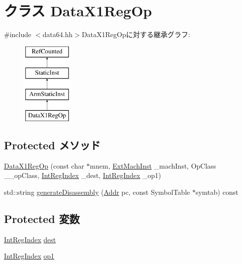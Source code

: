 \hypertarget{classArmISA_1_1DataX1RegOp}{
\section{クラス DataX1RegOp}
\label{classArmISA_1_1DataX1RegOp}
}


{\ttfamily \#include $<$data64.hh$>$}DataX1RegOpに対する継承グラフ:\begin{figure}[H]
\begin{center}
\leavevmode
\includegraphics[height=4cm]{classArmISA_1_1DataX1RegOp}
\end{center}
\end{figure}
\subsection*{Protected メソッド}
\begin{DoxyCompactItemize}
\item 
\hyperlink{classArmISA_1_1DataX1RegOp_a32e724330de9abbc94cd6f191b2a7cdb}{DataX1RegOp} (const char $\ast$mnem, \hyperlink{classStaticInst_a5605d4fc727eae9e595325c90c0ec108}{ExtMachInst} \_\-machInst, OpClass \_\-\_\-opClass, \hyperlink{namespaceArmISA_ae64680ba9fb526106829d6bf92fc791b}{IntRegIndex} \_\-dest, \hyperlink{namespaceArmISA_ae64680ba9fb526106829d6bf92fc791b}{IntRegIndex} \_\-op1)
\item 
std::string \hyperlink{classArmISA_1_1DataX1RegOp_a95d323a22a5f07e14d6b4c9385a91896}{generateDisassembly} (\hyperlink{classm5_1_1params_1_1Addr}{Addr} pc, const SymbolTable $\ast$symtab) const 
\end{DoxyCompactItemize}
\subsection*{Protected 変数}
\begin{DoxyCompactItemize}
\item 
\hyperlink{namespaceArmISA_ae64680ba9fb526106829d6bf92fc791b}{IntRegIndex} \hyperlink{classArmISA_1_1DataX1RegOp_aec72e8e45bdc87abeeeb75d2a8a9a716}{dest}
\item 
\hyperlink{namespaceArmISA_ae64680ba9fb526106829d6bf92fc791b}{IntRegIndex} \hyperlink{classArmISA_1_1DataX1RegOp_a4c465c43ad568f8bcf8ae71480e9cfea}{op1}
\end{DoxyCompactItemize}


